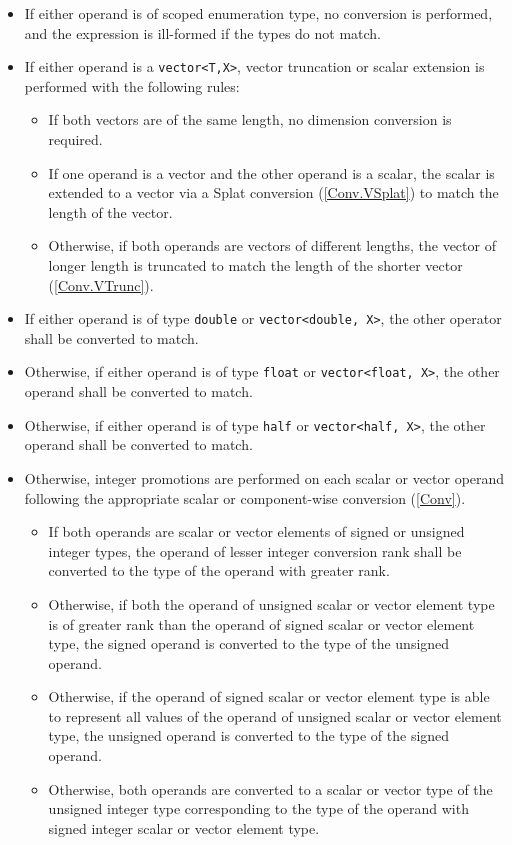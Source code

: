 \begin{itemize}
  \item If either operand is of scoped enumeration type, no conversion is
  performed, and the expression is ill-formed if the types do not match.
  \item If either operand is a \texttt{vector<T,X>}, vector truncation or scalar
  extension is performed with the following rules:
  \begin{itemize}
    \item If both vectors are of the same length, no dimension conversion is
    required.
    \item If one operand is a vector and the other operand is a scalar, the
    scalar is extended to a vector via a Splat conversion (\ref{Conv.VSplat}) to
    match the length of the vector.
    \item Otherwise, if both operands are vectors of different lengths, the
    vector of longer length is truncated to match the length of the shorter
    vector (\ref{Conv.VTrunc}).
  \end{itemize}
  \item If either operand is of type \texttt{double} or \texttt{vector<double,
  X>}, the other operator shall be converted to match.
  \item Otherwise, if either operand is of type \texttt{float} or \texttt{vector<float,
  X>}, the other operand shall be converted to match.
  \item Otherwise, if either operand is of type \texttt{half} or \texttt{vector<half, X>},
  the other operand shall be converted to match.
  \item Otherwise, integer promotions are performed on each scalar or vector
  operand following the appropriate scalar or component-wise conversion
  (\ref{Conv}).
  \begin{itemize}
    \item If both operands are scalar or vector elements of signed or unsigned
    integer types, the operand of lesser integer conversion rank shall be
    converted to the type of the operand with greater rank.
    \item Otherwise, if both the operand of unsigned scalar or vector element
    type is of greater rank than the operand of signed scalar or vector element
    type, the signed operand is converted to the type of the unsigned operand.
    \item Otherwise, if the operand of signed scalar or vector element type is
    able to represent all values of the operand of unsigned scalar or vector
    element type, the unsigned operand is converted to the type of the signed
    operand.
    \item Otherwise, both operands are converted to a scalar or vector type of
    the unsigned integer type corresponding to the type of the operand with
    signed integer scalar or vector element type.
  \end{itemize}
\end{itemize}

